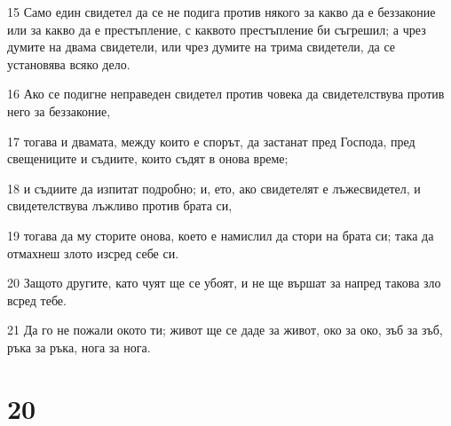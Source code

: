 \par 15 Само един свидетел да се не подига против някого за какво да е беззаконие или за какво да е престъпление, с каквото престъпление би съгрешил; а чрез думите на двама свидетели, или чрез думите на трима свидетели, да се установява всяко дело.
\par 16 Ако се подигне неправеден свидетел против човека да свидетелствува против него за беззаконие,
\par 17 тогава и двамата, между които е спорът, да застанат пред Господа, пред свещениците и съдиите, които съдят в онова време;
\par 18 и съдиите да изпитат подробно; и, ето, ако свидетелят е лъжесвидетел, и свидетелствува лъжливо против брата си,
\par 19 тогава да му сторите онова, което е намислил да стори на брата си; така да отмахнеш злото изсред себе си.
\par 20 Защото другите, като чуят ще се убоят, и не ще вършат за напред такова зло всред тебе.
\par 21 Да го не пожали окото ти; живот ще се даде за живот, око за око, зъб за зъб, ръка за ръка, нога за нога.

\chapter{20}

